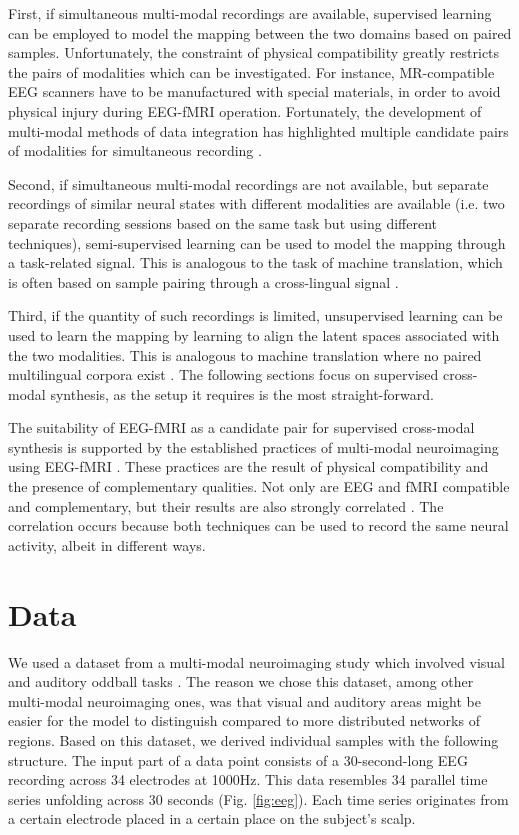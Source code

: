 \documentclass{article}
\begin{document}
First, if simultaneous multi-modal recordings are available, supervised learning can be employed to model the mapping between the two domains based on paired samples. Unfortunately, the constraint of physical compatibility greatly restricts the pairs of modalities which can be investigated. For instance, MR-compatible EEG scanners have to be manufactured with special materials, in order to avoid physical injury during EEG-fMRI operation. Fortunately, the development of multi-modal methods of data integration has highlighted multiple candidate pairs of modalities for simultaneous recording \cite{yi_generative_2019}.

Second, if simultaneous multi-modal recordings are not available, but separate recordings of similar neural states with different modalities are available (i.e. two separate recording sessions based on the same task but using different techniques), semi-supervised learning can be used to model the mapping through a task-related signal. This is analogous to the task of machine translation, which is often based on sample pairing through a cross-lingual signal \cite{zhang_neural_2020}.

Third, if the quantity of such recordings is limited, unsupervised learning can be used to learn the mapping by learning to align the latent spaces associated with the two modalities. This is analogous to machine translation where no paired multilingual corpora exist \cite{lample_phrase-based_2018}. The following sections focus on supervised cross-modal synthesis, as the setup it requires is the most straight-forward.

The suitability of EEG-fMRI as a candidate pair for supervised cross-modal synthesis is supported by the established practices of multi-modal neuroimaging using EEG-fMRI \cite{huster_methods_2012}. These practices are the result of physical compatibility and the presence of complementary qualities. Not only are EEG and fMRI compatible and complementary, but their results are also strongly correlated \cite{ostwald_eeg-fmri_2009}. The correlation occurs because both techniques can be used to record the same neural activity, albeit in different ways.

\section{Data}

We used a dataset from a multi-modal neuroimaging study which involved visual and auditory oddball tasks \cite{noauthor_auditory_nodate}. The reason we chose this dataset, among other multi-modal neuroimaging ones, was that visual and auditory areas might be easier for the model to distinguish compared to more distributed networks of regions. Based on this dataset, we derived individual samples with the following structure. The input part of a data point consists of a 30-second-long EEG recording across 34 electrodes at 1000Hz. This data resembles 34 parallel time series unfolding across 30 seconds (Fig. \ref{fig:eeg}). Each time series originates from a certain electrode placed in a certain place on the subject's scalp.
\end{document}
